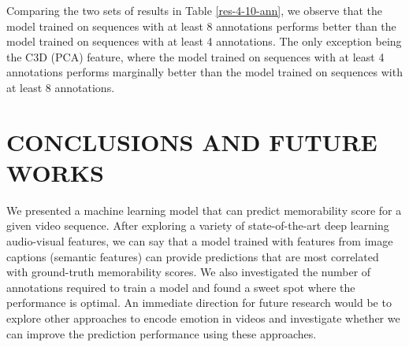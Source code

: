 \documentclass[sigconf]{acmart}
\begin{document}
Comparing the two sets of results in Table \ref{res-4-10-ann}, we observe that the model trained on sequences with at least 8 annotations performs better than the model trained on sequences with at least 4 annotations.
The only exception being the C3D (PCA) feature, where the model trained on sequences with at least 4 annotations performs marginally better than the model trained on sequences with at least 8 annotations. 

\section{CONCLUSIONS AND FUTURE WORKS}
We presented a machine learning model that can predict memorability score for a given video sequence.
After exploring a variety of state-of-the-art deep learning audio-visual features, we can say that a model trained with features from image captions (semantic features) can provide predictions that are most correlated with ground-truth memorability scores.
We also investigated the number of annotations required to train a model and found a sweet spot where the performance is optimal.
An immediate direction for future research would be to explore other approaches to encode emotion in videos and investigate whether we can improve the prediction performance using these approaches.


\end{document}
